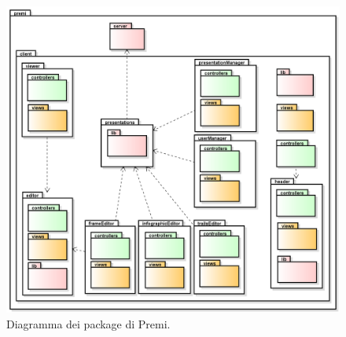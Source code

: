 \begin{figure}[h]
\begin{center}
\includegraphics[scale=0.35]{img/diapkg/package.png}
\caption{Diagramma dei package di Premi.}
\end{center}
\end{figure}

